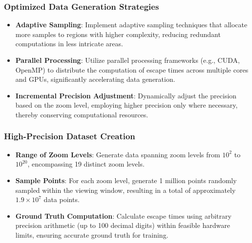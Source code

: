 \documentclass[journal]{IEEEaccess}
\begin{document}
\subsubsection{Optimized Data Generation Strategies}
\begin{itemize}
    \item \textbf{Adaptive Sampling}: Implement adaptive sampling techniques that allocate more samples to regions with higher complexity, reducing redundant computations in less intricate areas.
    
    \item \textbf{Parallel Processing}: Utilize parallel processing frameworks (e.g., CUDA, OpenMP) to distribute the computation of escape times across multiple cores and GPUs, significantly accelerating data generation.
    
    \item \textbf{Incremental Precision Adjustment}: Dynamically adjust the precision based on the zoom level, employing higher precision only where necessary, thereby conserving computational resources.
\end{itemize}

\subsubsection{High-Precision Dataset Creation}
\begin{itemize}
    \item \textbf{Range of Zoom Levels}: Generate data spanning zoom levels from \(10^2\) to \(10^{20}\), encompassing 19 distinct zoom levels.
    
    \item \textbf{Sample Points}: For each zoom level, generate 1 million points randomly sampled within the viewing window, resulting in a total of approximately \(1.9 \times 10^{7}\) data points.
    
    \item \textbf{Ground Truth Computation}: Calculate escape times using arbitrary precision arithmetic (up to 100 decimal digits) within feasible hardware limits, ensuring accurate ground truth for training.
\end{itemize}
\end{document}
